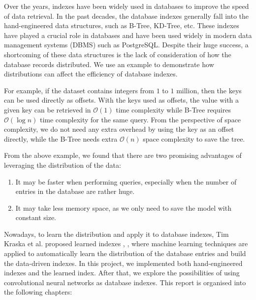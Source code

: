 Over the years, indexes have been widely used in databases to improve the speed of data retrieval. In the past decades, the database indexes generally fall into the hand-engineered data structures, such as B-Tree, KD-Tree, etc. These indexes have played a crucial role in databases and have been used widely in modern data management systems (DBMS) such as PostgreSQL. Despite their huge success, a shortcoming of these data structures is the lack of consideration of how the database records distributed. We use an example to demonstrate how distributions can affect the efficiency of database indexes.

\begin{mscexample}
	For example, if the dataset contains integers from $1$ to $1$ million, then the keys can be used directly as offsets. With the keys used as offsets, the value with a given key can be retrieved in $\mathcal{O}(1)$ time complexity while B-Tree requires $\mathcal{O}(\log n)$ time complexity for the same query. From the perspective of space complexity, we do not need any extra overhead by using the key as an offset directly, while the B-Tree needs extra $\mathcal{O}(n)$ space complexity to save the tree.
\end{mscexample}

From the above example, we found that there are two promising advantages of leveraging the distribution of the data:
\begin{enumerate}
  \item It may be faster when performing queries, especially when the number of entries in the database are rather huge.
  \item It may take less memory space, as we only need to save the model with constant size.
  \end{enumerate}

Nowadays, to learn the distribution and apply it to database indexes, Tim Kraska et al. proposed learned indexes \cite{kraska2018case}, \cite{li2020lisa}, where machine learning techniques are applied to automatically learn the distribution of the database entries and build the data-driven indexes. In this project, we implemented both hand-engineered indexes and the learned index. After that, we explore the possibilities of using convolutional neural networks as database indexes. This report is organised into the following chapters:

